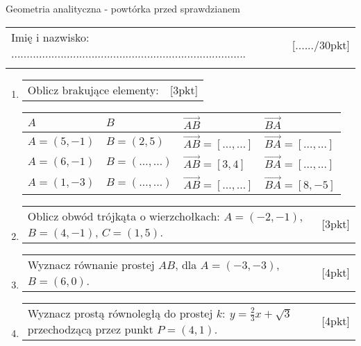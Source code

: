 \documentclass[12pt,a4paper]{article}
\begin{document}
	\begin{center}
		\LARGE Geometria analityczna - powtórka przed sprawdzianem
	\end{center}
	\vspace{1.5cm}
	\begin{tabular}{p{13cm} r}
		Imię i nazwisko: ............................................................................
		&[....../30pkt]\\ 
		\vspace{0.5cm}
	\end{tabular}
	\begin{enumerate}[1.]
		\item  \begin{tabular}{p{13cm} r}
		Oblicz brakujące elementy: &[3pkt]\\ 
		\end{tabular}
	
	\begin{tabular}{|p{3cm} |p{3cm} |p{3cm} |p{3cm}|}
		\hline
		$A$ & $B$ & $\overrightarrow{AB}$ & $\overrightarrow{BA}$\\ 
		\hline
		$A=(5,-1)$ & $B=(2,5)$ & $\overrightarrow{AB}=[\dots,\dots]$ & $\overrightarrow{BA}=[\dots,\dots]$\\ 
		\hline
		$A=(6,-1)$ & $B=(\dots,\dots)$ & $\overrightarrow{AB}=[3,4]$ & $\overrightarrow{BA}=[\dots,\dots]$\\ 
		\hline
		$A=(1,-3)$ & $B=(\dots,\dots)$ & $\overrightarrow{AB}=[\dots,\dots]$ & $\overrightarrow{BA}=[8,-5]$\\ 
		\hline
	\end{tabular}

	\item  \begin{tabular}{p{13cm} r}
		Oblicz obwód trójkąta o wierzchołkach: \newline $A=(-2,-1)$, $B=(4,-1)$, $C=(1,5)$. &[3pkt]\\ 
	\end{tabular}

	\item \begin{tabular}{p{13cm} r}
		Wyznacz równanie prostej $AB$, dla $A=(-3,-3)$, $B=(6,0)$. &[4pkt]\\ 
	\end{tabular}

	\item \begin{tabular}{p{13cm} r}
		Wyznacz prostą równoległą do prostej $k: \: y=\frac{2}{3}x+\sqrt{3}$ przechodzącą przez punkt $P=(4,1)$.&[4pkt]\\ 
	\end{tabular}


\end{enumerate}
\end{document}
